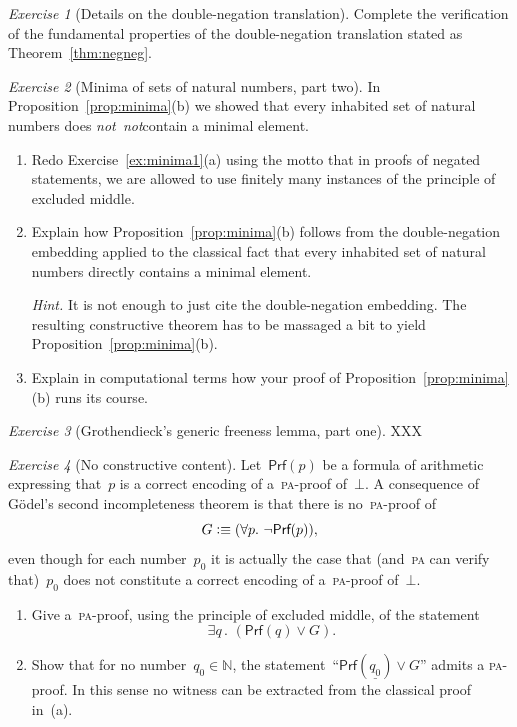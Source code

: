 \documentclass[10pt,reqno,a4paper,openany]{amsbook}
\theoremstyle{definition}
\theoremstyle{plain}
\theoremstyle{remark}
\newcommand{\NN}{\mathbb{N}}
\newcommand{\?}{\,{:}\,}
\renewcommand{\_}{\mathpunct{.}\,}
\newcommand{\defequiv}{\vcentcolon\equiv}
\newtheorem{exercise}{Exercise}[chapter]
\newcommand{\notnot}{\emph{not~not}}
\begin{document}
\begin{exercise}[Details on the double-negation translation]
Complete the verification of the fundamental properties of the double-negation
translation stated as Theorem~\ref{thm:negneg}.
\end{exercise}

\begin{exercise}[Minima of sets of natural numbers, part two]
In Proposition~\ref{prop:minima}(b) we showed that every inhabited set of natural
numbers does \notnot contain a minimal element.
\begin{enumerate}
\item Redo Exercise~\ref{ex:minima1}(a) using the motto that in proofs of
negated statements, we are allowed to use finitely many instances of the
principle of excluded middle.
\item Explain how Proposition~\ref{prop:minima}(b) follows
from the double-negation embedding applied to the classical fact that every
inhabited set of natural numbers directly contains a minimal element.

{\noindent\scriptsize\emph{Hint.} It is not enough to just cite the
double-negation embedding. The resulting constructive theorem has to be
massaged a bit to yield Proposition~\ref{prop:minima}(b).\par}
\item Explain in computational terms how your proof of
Proposition~\ref{prop:minima}(b) runs its course.
\end{enumerate}
\end{exercise}

\begin{exercise}[Grothendieck's generic freeness lemma, part one]
XXX
\end{exercise}

\begin{exercise}[No constructive content]\label{ex:no-constructive-content}
Let~$\textsf{Prf}(p)$ be a formula of arithmetic expressing that~$p$ is a
correct encoding of a~\textsc{pa}-proof of~$\bot$. A consequence of Gödel's
second incompleteness theorem is that there is no~\textsc{pa}-proof of
\[ G \defequiv (\forall p\_ \neg\textsf{Prf}(p)), \]
even though for each number~$p_0$ it is actually the case that (and~\textsc{pa}
can verify that)~$p_0$ does not constitute a correct encoding of
a~\textsc{pa}-proof of~$\bot$.
\begin{enumerate}
\item Give a~\textsc{pa}-proof, using the principle of excluded middle, of the
statement
\[ \exists q\_ (\textsf{Prf}(q) \vee G). \]
\item Show that for no number~$q_0 \in \NN$, the
statement~``$\textsf{Prf}(\underline{q_0})
\vee G$'' admits a \textsc{pa}-proof. In this sense no witness can be
extracted from the classical proof in~(a).
\end{enumerate}
\end{exercise}
\end{document}
